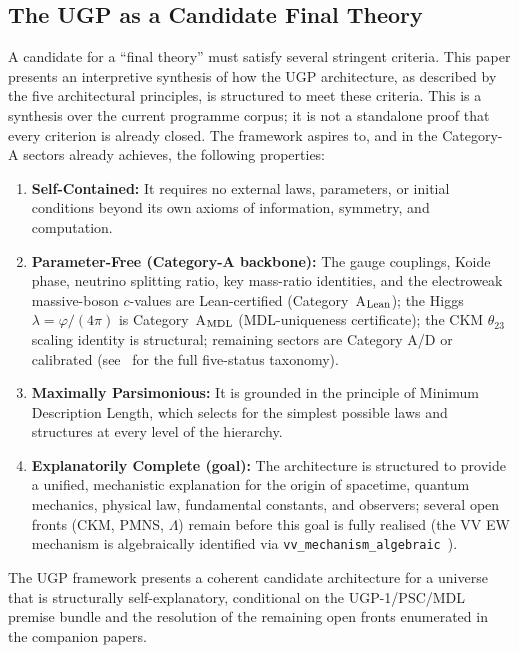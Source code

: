 \documentclass[12pt]{article}
\begin{document}
\subsection{The UGP as a Candidate Final Theory}
A candidate for a ``final theory'' must satisfy several stringent criteria.
This paper presents an interpretive synthesis of how the UGP architecture,
as described by the five architectural principles, is structured to meet these criteria.
This is a synthesis over the current programme corpus; it is not a standalone proof that every criterion is already closed.
The framework aspires to, and in the Category-A sectors already achieves, the following properties:
\begin{enumerate}[label=(\roman*)]
    \item \textbf{Self-Contained:} It requires no external laws, parameters, or initial conditions beyond its own axioms of information, symmetry, and computation.
    \item \textbf{Parameter-Free (Category-A backbone):} The gauge couplings, Koide phase, neutrino splitting ratio, key mass-ratio identities, and the electroweak massive-boson $c$-values are Lean-certified (Category~A$_{\rm Lean}$); the Higgs $\lambda = \varphi/(4\pi)$ is Category~A$_{\rm MDL}$ (MDL-uniqueness certificate); the CKM $\theta_{23}$ scaling identity is structural; remaining sectors are Category A/D or calibrated (see~\cite{Spivack2026_SM_UGP} for the full five-status taxonomy).
    \item \textbf{Maximally Parsimonious:} It is grounded in the principle of Minimum Description Length, which selects for the simplest possible laws and structures at every level of the hierarchy.
    \item \textbf{Explanatorily Complete (goal):} The architecture is structured to provide a unified, mechanistic explanation for the origin of spacetime, quantum mechanics, physical law, fundamental constants, and observers; several open fronts (CKM, PMNS, $\Lambda$) remain before this goal is fully realised (the VV EW mechanism is algebraically identified via \texttt{vv\_mechanism\_algebraic}~\cite{Spivack2026_SM_UGP}).
\end{enumerate}
The UGP framework presents a coherent candidate architecture for a universe that is structurally self-explanatory, conditional on the UGP-1/PSC/MDL premise bundle and the resolution of the remaining open fronts enumerated in the companion papers.

\end{document}
